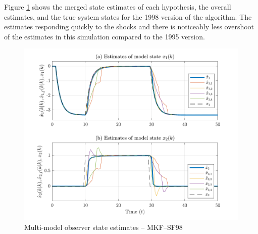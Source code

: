 Figure \ref{fig:rod-obs-sim-test-x_est-SF98} shows the merged state estimates of each hypothesis, the overall estimates, and the true system states for the 1998 version of the algorithm. The estimates responding quickly to the shocks and there is noticeably less overshoot of the estimates in this simulation compared to the 1995 version.   
\begin{figure}[htp]
	\centering
	\includegraphics[width=13cm]{images/rod_MKF_test_sim_MKF_SF98_x_est.pdf}
	\caption{Multi-model observer state estimates – MKF--SF98}
	\label{fig:rod-obs-sim-test-x_est-SF98}
\end{figure}

